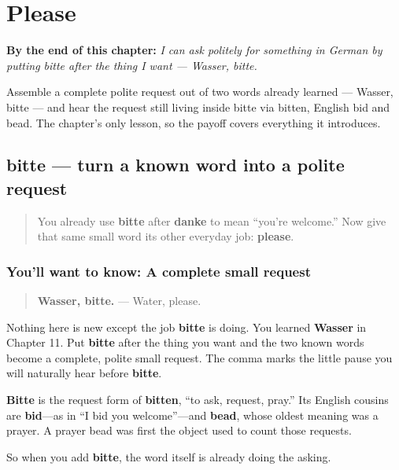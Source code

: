 
\chapter{Please}
\label{ch:ge-please}

\begin{chapteropening}
\textbf{By the end of this chapter:} \emph{I can ask politely for something in German by putting bitte after the thing I want — Wasser, bitte.}

Assemble a complete polite request out of two words already learned — Wasser, bitte — and hear the request still living inside bitte via bitten, English bid and bead. The chapter's only lesson, so the payoff covers everything it introduces.
\end{chapteropening}

\section[bitte]{bitte — turn a known word into a polite request}

\label{lesson:GE-C19-bitte-requests}



\begin{quote}
You already use \textbf{bitte} after \textbf{danke} to mean “you’re welcome.” Now give that same small word its other everyday job: \textbf{please}.
\end{quote}

\subsection*{You'll want to know: A complete small request}
\begin{quote}
\textbf{Wasser, bitte.} — Water, please.
\end{quote}

Nothing here is new except the job \textbf{bitte} is doing. You learned \textbf{Wasser} in Chapter 11. Put \textbf{bitte} after the thing you want and the two known words become a complete, polite small request. The comma marks the little pause you will naturally hear before \textbf{bitte}.

\begin{cousinweb}
\textbf{Bitte} is the request form of \textbf{bitten}, “to ask, request, pray.” Its English cousins are \textbf{bid}—as in “I bid you welcome”—and \textbf{bead}, whose oldest meaning was a prayer. A prayer bead was first the object used to count those requests.

So when you add \textbf{bitte}, the word itself is already doing the asking.
\end{cousinweb}


